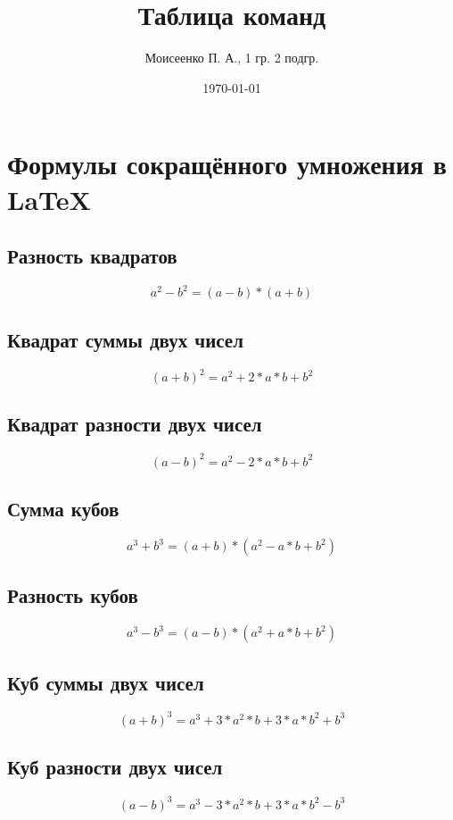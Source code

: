 \documentclass[a4paper,12pt]{article} %
\author{Моисеенко П. А., 1 гр. 2 подгр.} %
\title{Таблица команд} %
\date{\today} %
\begin{document}
\maketitle
\newpage
\section{Формулы сокращённого умножения в \LaTeX}
\subsection{Разность квадратов}
\begin{equation}
a^2-b^2=(a-b)*(a+b)
\end{equation}

\subsection{Квадрат суммы двух чисел}
\begin{equation}
(a+b)^2=a^2+2*a*b+b^2
\end{equation}

\subsection{Квадрат разности двух чисел}
\begin{equation}
(a-b)^2=a^2-2*a*b+b^2
\end{equation}

\subsection{Сумма кубов}
\begin{equation}
a^3+b^3=(a+b)*(a^2-a*b+b^2)
\end{equation}

\subsection{Разность кубов}
\begin{equation}
a^3-b^3=(a-b)*(a^2+a*b+b^2)
\end{equation}

\subsection{Куб суммы двух чисел}
\begin{equation}
(a+b)^3=a^3+3*a^2*b+3*a*b^2+b^3
\end{equation}

\subsection{Куб разности двух чисел}
\begin{equation}
(a-b)^3=a^3-3*a^2*b+3*a*b^2-b^3
\end{equation}
\end{document}
